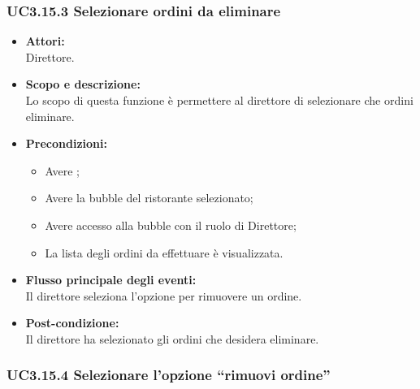\subsubsection{UC3.15.3 Selezionare ordini da eliminare} \label{UC3.15.3}

\begin{itemize}
	\item \textbf{Attori:}
	\\Direttore.
	\item \textbf{Scopo e descrizione:} 
	\\Lo scopo di questa funzione è permettere al direttore di selezionare che ordini eliminare.
	\item \textbf{Precondizioni:}
	\begin{itemize}
		\item Avere ;
		\item Avere la bubble del ristorante selezionato;
		\item Avere accesso alla bubble con il ruolo di Direttore;
		\item La lista degli ordini da effettuare è visualizzata.
	\end{itemize}
	\item \textbf{Flusso principale degli eventi:}
	\\Il direttore seleziona l’opzione per rimuovere un ordine.
	\item \textbf{Post-condizione:}
	\\Il direttore ha selezionato gli ordini che desidera eliminare.
\end{itemize}

\subsubsection{UC3.15.4 Selezionare l’opzione “rimuovi ordine”} \label{UC3.15.4}


